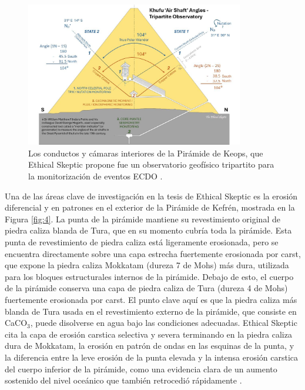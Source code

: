 \documentclass[10pt,twocolumn,letterpaper]{article}
\begin{document}
\begin{figure}[b]
\begin{center}
\includegraphics[width=0.85\textwidth]{shafts.jpg}
\end{center}
   \caption{Los conductos y cámaras interiores de la Pirámide de Keops, que Ethical Skeptic propone fue un observatorio geofísico tripartito para la monitorización de eventos ECDO \cite{28}.}
\label{fig:5}
\end{figure}

Una de las áreas clave de investigación en la tesis de Ethical Skeptic es la erosión diferencial y en patrones en el exterior de la Pirámide de Kefrén, mostrada en la Figura \ref{fig:4}. La punta de la pirámide mantiene su revestimiento original de piedra caliza blanda de Tura, que en su momento cubría toda la pirámide. Esta punta de revestimiento de piedra caliza está ligeramente erosionada, pero se encuentra directamente sobre una capa estrecha fuertemente erosionada por carst, que expone la piedra caliza Mokkatam (dureza 7 de Mohs) más dura, utilizada para los bloques estructurales internos de la pirámide. Debajo de esto, el cuerpo de la pirámide conserva una capa de piedra caliza de Tura (dureza 4 de Mohs) fuertemente erosionada por carst. El punto clave aquí es que la piedra caliza más blanda de Tura usada en el revestimiento externo de la pirámide, que consiste en CaCO$_3$, puede disolverse en agua bajo las condiciones adecuadas. Ethical Skeptic cita la capa de erosión carstica selectiva y severa terminando en la piedra caliza dura de Mokkatam, la erosión en patrón de ondas en las esquinas de la punta, y la diferencia entre la leve erosión de la punta elevada y la intensa erosión carstica del cuerpo inferior de la pirámide, como una evidencia clara de un aumento sostenido del nivel oceánico que también retrocedió rápidamente \cite{27}.
\end{document}
